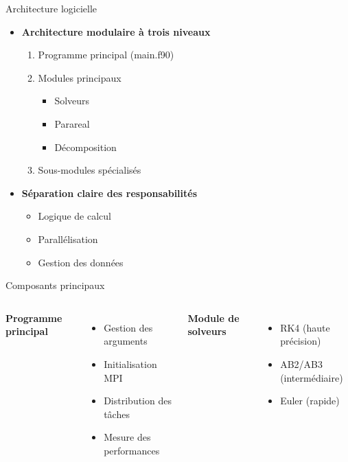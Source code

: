 
\begin{frame}{Architecture logicielle}
    \begin{itemize}
        \item \textbf{Architecture modulaire à trois niveaux}
        \begin{enumerate}
            \item Programme principal (main.f90)
            \item Modules principaux
            \begin{itemize}
                \item Solveurs
                \item Parareal
                \item Décomposition
            \end{itemize}
            \item Sous-modules spécialisés
        \end{enumerate}
        \item \textbf{Séparation claire des responsabilités}
        \begin{itemize}
            \item Logique de calcul
            \item Parallélisation
            \item Gestion des données
        \end{itemize}
    \end{itemize}
\end{frame}

\begin{frame}{Composants principaux}
    \begin{columns}
        \textbf{Programme principal}
        \begin{itemize}
            \item Gestion des arguments
            \item Initialisation MPI
            \item Distribution des tâches
            \item Mesure des performances
        \end{itemize}
        
        \textbf{Module de solveurs}
        \begin{itemize}
            \item RK4 (haute précision)
            \item AB2/AB3 (intermédiaire)
            \item Euler (rapide)
        \end{itemize}
    \end{columns}
\end{frame}

